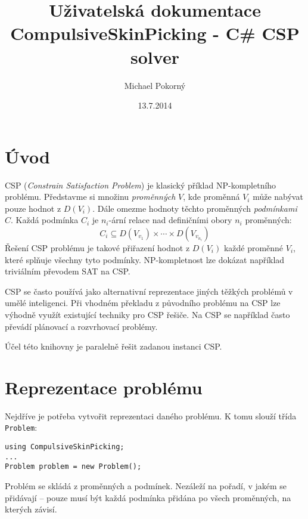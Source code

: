 \documentclass[a4paper]{article}
\begin{document}
\title{Uživatelská dokumentace \\ CompulsiveSkinPicking - C\# CSP solver}
\author{Michael Pokorný}
\date{13.7.2014}

\maketitle

\tableofcontents

\section{Úvod}
CSP (\textit{Constrain Satisfaction Problem}) je klasický příklad
NP-kompletního problému.
Představme si množinu \textit{proměnných} $V$, kde proměnná
$V_i$ může nabývat pouze hodnot z $D(V_i)$. Dále omezme hodnoty těchto proměnných
\textit{podmínkami} $C$. Každá podmínka $C_i$ je $n_i$-ární relace nad definičními
obory $n_i$ proměnných:
$$C_i \subseteq D(V_{v_1})\times \cdots \times D(V_{v_{n_i}})$$
Řešení CSP problému je takové přiřazení hodnot z $D(V_i)$ každé proměnné
$V_i$, které splňuje všechny tyto podmínky. NP-kompletnost lze dokázat například
triviálním převodem SAT na CSP.

CSP se často používá jako alternativní reprezentace jiných těžkých problémů v
umělé inteligenci. Při vhodném překladu z původního problému na CSP lze výhodně
využít existující techniky pro CSP řešiče. Na CSP se například často převádí
plánovací a rozvrhovací problémy.

Účel této knihovny je paralelně řešit zadanou instanci CSP.

\section{Reprezentace problému}
Nejdříve je potřeba vytvořit reprezentaci daného problému.
K tomu slouží třída \texttt{Problem}:
\begin{lstlisting}
using CompulsiveSkinPicking;
...
Problem problem = new Problem();
\end{lstlisting}

Problém se skládá z proměnných a podmínek.
Nezáleží na pořadí, v jakém se přidávají -- pouze musí být každá podmínka
přidána po všech proměnných, na kterých závisí.
\end{document}

